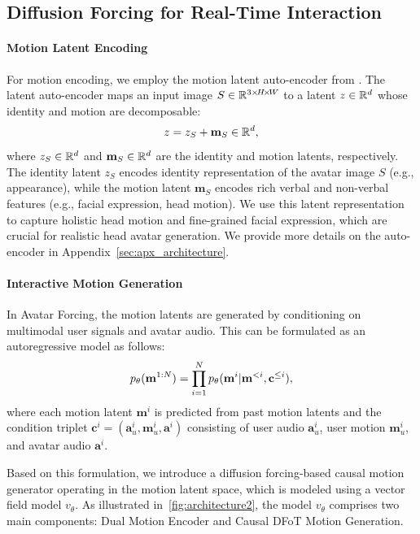 \subsection{Diffusion Forcing for Real-Time Interaction} \label{sec:df_motion_sample}
\paragraph{Motion Latent Encoding} 
For motion encoding, we employ the motion latent auto-encoder from \citet{float}. The latent auto-encoder maps an input image $S\in\mathbb{R}^{3 \times\! H \!\times\! W}$ to a latent $z \in \mathbb{R}^d$ whose identity and motion are decomposable:
\begin{equation}
    z = z_{S} + \mathbf{m}_S \in \mathbb{R}^d,
\end{equation}
where $z_{S}\in\mathbb{R}^d$ and $\mathbf{m}_S\in\mathbb{R}^d$ are the identity and motion latents, respectively. The identity latent $z_S$ encodes identity representation of the avatar image $S$ (e.g., appearance), while the motion latent $\mathbf{m}_S$ encodes rich verbal and non-verbal features (e.g., facial expression, head motion). We use this latent representation to capture holistic head motion and fine-grained facial expression, which are crucial for realistic head avatar generation.
We provide more details on the auto-encoder in Appendix~\ref{sec:apx_architecture}.


\paragraph{Interactive Motion Generation}
In Avatar Forcing, the motion latents are generated by conditioning on multimodal user signals and avatar audio. This can be formulated as an autoregressive model as follows:
\begin{equation}
    \vspace*{-1mm}
    p_{\theta}( \mathbf{m}^{1:N}) = \prod_{i=1}^{N} p_{\theta}(\mathbf{m}^i | \mathbf{m}^{<i}, \mathbf{c}^{\leq i}), \label{eq:task}
    \vspace*{-1mm}
\end{equation}
where each motion latent $\mathbf{m}^i$ is predicted from past motion latents and the condition triplet $\mathbf{c}^{i} = (\mathbf{a}_u^{i}, \mathbf{m}_u^i, \mathbf{a}^i)$ consisting of user audio $\mathbf{a}_u^{i}$, user motion $\mathbf{m}_u^i$, and avatar audio $\mathbf{a}^i$.


Based on this formulation, we introduce a diffusion forcing-based causal motion generator operating in the motion latent space, which is modeled using a vector field model $v_\theta$. As illustrated in~\cref{fig:architecture2}, the model $v_\theta$ comprises two main components: Dual Motion Encoder and Causal DFoT Motion Generation.

